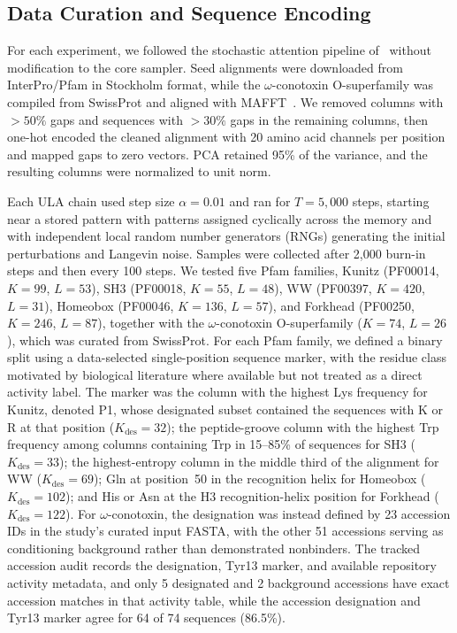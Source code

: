 \subsection{Data Curation and Sequence Encoding}

For each experiment, we followed the stochastic attention pipeline
of~\cite{varnerSAProtein2026} without modification to the core sampler. Seed alignments were
downloaded from InterPro/Pfam in Stockholm format, while the $\omega$-conotoxin O-superfamily
was compiled from SwissProt and aligned with MAFFT~\cite{mafft2013}. We removed columns with
$>50\%$ gaps and sequences with $>30\%$ gaps in the remaining columns, then one-hot encoded the
cleaned alignment with 20 amino acid channels per position and mapped gaps to zero vectors.
PCA retained 95\% of the variance, and the resulting columns were normalized to unit norm.

Each ULA chain used step size $\alpha=0.01$ and ran for $T=5{,}000$ steps, starting near a
stored pattern with patterns assigned cyclically across the memory and with independent local
random number generators (RNGs) generating the initial perturbations and Langevin noise. Samples were collected after
2{,}000 burn-in steps and then every 100 steps. We tested five Pfam families, Kunitz
(PF00014, $K=99$, $L=53$), SH3 (PF00018, $K=55$, $L=48$), WW (PF00397, $K=420$, $L=31$),
Homeobox (PF00046, $K=136$, $L=57$), and Forkhead (PF00250, $K=246$, $L=87$), together with
the $\omega$-conotoxin O-superfamily ($K=74$, $L=26$), which was curated from
SwissProt. For each Pfam family, we defined a binary split using a data-selected
single-position sequence marker, with the residue class motivated by biological literature
where available but not treated as a direct activity label. The marker was the column with the
highest Lys frequency for Kunitz, denoted P1, whose designated subset contained the sequences
with K or R at that position ($K_{\mathrm{des}}=32$); the peptide-groove column with the
highest Trp frequency among
columns containing Trp in 15--85\% of sequences for SH3 ($K_{\mathrm{des}}=33$); the
highest-entropy column in the middle third of the alignment for WW ($K_{\mathrm{des}}=69$);
Gln at position~50 in the recognition helix for Homeobox ($K_{\mathrm{des}}=102$); and His or
Asn at the H3 recognition-helix position for Forkhead ($K_{\mathrm{des}}=122$). For
$\omega$-conotoxin, the designation was instead defined by 23 accession IDs in the study's
curated input FASTA, with the other 51 accessions serving as conditioning background rather
than demonstrated nonbinders. The tracked accession audit records the designation, Tyr13
marker, and available repository activity metadata, and only 5 designated and 2 background
accessions have exact accession matches in that activity table, while the accession designation
and Tyr13 marker agree for 64 of 74 sequences (86.5\%).

